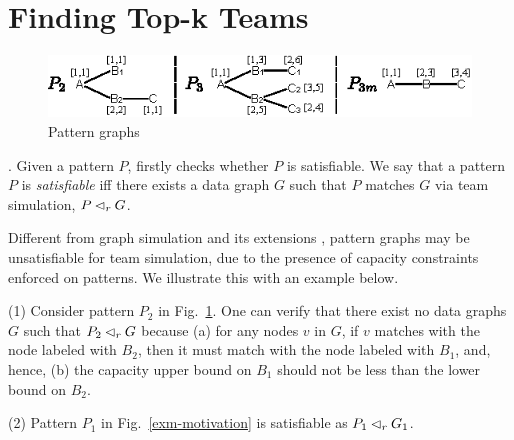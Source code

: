 \section{Finding Top-k Teams}
\label{sec-tsimAlg}


\begin{figure}[tb!]
	\begin{center}
		\includegraphics[scale=1.28]{./fig/consistency_motivation.eps}
	\end{center}
	\vspace{-3ex}
	\caption{Pattern graphs}
	\vspace{-4ex}
	\label{fig-consistency-example}
\end{figure}




.
Given a pattern $P$, \grouprec firstly checks whether $P$ is satisfiable. We say that a pattern $P$ is {\em satisfiable} iff there exists a data graph $G$ such that $P$ matches $G$ via team simulation, \ie $P \lhd_r G$.

Different from graph simulation \cite{infsimu95} and its extensions \cite{FanLMTWW10,MaCFHW14},
pattern graphs may be unsatisfiable for team simulation, due to the presence of capacity constraints enforced on patterns. We illustrate this with an example below.

\begin{example}
\label{exm-consistency}
\ni(1)  Consider pattern $P_2$ in Fig.~\ref{fig-consistency-example}.
One can verify that there exist no data graphs $G$ such that $P_2 \lhd_r G$ because (a) for any nodes $v$ in $G$, if $v$ matches with the node labeled with $B_2$, then it must match with the node labeled with $B_1$, and, hence, (b) the capacity upper bound on $B_1$ should not be less than the lower bound on $B_2$.

\sstab(2) Pattern $P_1$ in Fig.~\ref{exm-motivation} is satisfiable as $P_1 \lhd_r G_1$.
\end{example}


